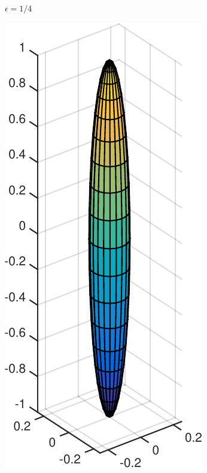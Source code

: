 \documentclass[a4paper,11pt]{kth-mag}
\begin{document}
\begin{figure}[!htbp]
\begin{subfigure}[h]{0.24\textwidth}
    \caption{$\epsilon=1/4$}\label{fig:slenderness_1_4}
  \end{subfigure}
  \begin{subfigure}[h]{0.24\textwidth}
    \centering
    \includegraphics[width=\textwidth]{img/slender/1_10.pdf}

\end{subfigure}
\end{figure}
\end{document}
